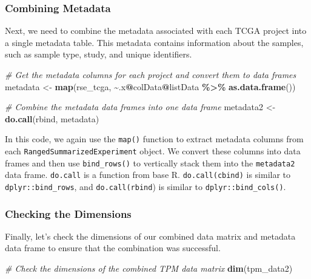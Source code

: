\documentclass[
]{book}
\newenvironment{Shaded}{\begin{snugshade}}{\end{snugshade}}
\newcommand{\CommentTok}[1]{\textcolor[rgb]{0.56,0.35,0.01}{\textit{#1}}}
\newcommand{\FunctionTok}[1]{\textcolor[rgb]{0.13,0.29,0.53}{\textbf{#1}}}
\newcommand{\NormalTok}[1]{#1}
\newcommand{\OtherTok}[1]{\textcolor[rgb]{0.56,0.35,0.01}{#1}}
\newcommand{\SpecialCharTok}[1]{\textcolor[rgb]{0.81,0.36,0.00}{\textbf{#1}}}
\begin{document}
\hypertarget{combining-metadata}{%
\subsubsection{Combining Metadata}\label{combining-metadata}}

Next, we need to combine the metadata associated with each TCGA project into a single metadata table. This metadata contains information about the samples, such as sample type, study, and unique identifiers.

\begin{Shaded}
\begin{Highlighting}[]
\CommentTok{\# Get the metadata columns for each project and convert them to data frames}
\NormalTok{metadata }\OtherTok{\textless{}{-}} \FunctionTok{map}\NormalTok{(rse\_tcga, }\SpecialCharTok{\textasciitilde{}}\NormalTok{.x}\SpecialCharTok{@}\NormalTok{colData}\SpecialCharTok{@}\NormalTok{listData }\SpecialCharTok{\%\textgreater{}\%} \FunctionTok{as.data.frame}\NormalTok{())}

\CommentTok{\# Combine the metadata data frames into one data frame}
\NormalTok{metadata2 }\OtherTok{\textless{}{-}} \FunctionTok{do.call}\NormalTok{(rbind, metadata)}
\end{Highlighting}
\end{Shaded}

In this code, we again use the \texttt{map()} function to extract metadata columns from each \texttt{RangedSummarizedExperiment} object. We convert these columns into data frames and then use \texttt{bind\_rows()} to vertically stack them into the \texttt{metadata2} data frame.
\texttt{do.call} is a function from base R. \texttt{do.call(cbind)} is similar to \texttt{dplyr::bind\_rows}, and \texttt{do.call(rbind}) is similar to \texttt{dplyr::bind\_cols()}.

\hypertarget{checking-the-dimensions}{%
\subsubsection{Checking the Dimensions}\label{checking-the-dimensions}}

Finally, let's check the dimensions of our combined data matrix and metadata data frame to ensure that the combination was successful.

\begin{Shaded}
\begin{Highlighting}[]
\CommentTok{\# Check the dimensions of the combined TPM data matrix}
\FunctionTok{dim}\NormalTok{(tpm\_data2)}
\end{Highlighting}
\end{Shaded}
\end{document}
